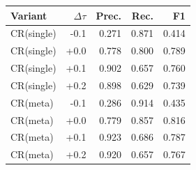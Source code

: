 \begin{tabular}{lrrrr}
\toprule
Variant & $\Delta\tau$ & Prec. & Rec. & F1 \\
\midrule
CR(single) & -0.1 & 0.271 & 0.871 & 0.414 \\
CR(single) & +0.0 & 0.778 & 0.800 & 0.789 \\
CR(single) & +0.1 & 0.902 & 0.657 & 0.760 \\
CR(single) & +0.2 & 0.898 & 0.629 & 0.739 \\
CR(meta) & -0.1 & 0.286 & 0.914 & 0.435 \\
CR(meta) & +0.0 & 0.779 & 0.857 & 0.816 \\
CR(meta) & +0.1 & 0.923 & 0.686 & 0.787 \\
CR(meta) & +0.2 & 0.920 & 0.657 & 0.767 \\
\bottomrule
\end{tabular}
